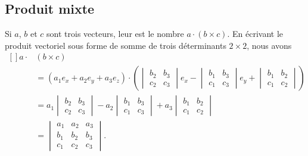 \subsection{Produit mixte}

Si $a$, $b$ et $c$ sont trois vecteurs, leur  est le nombre $a\cdot(b\times c)$. En écrivant le produit vectoriel sous forme de somme de trois déterminants $2\times 2$, nous avons
\begin{equation}
    \begin{aligned}[]
        a\cdot& (b\times c)\\&=(a_1e_x+a_2e_y+a_3e_z)\cdot\left(
        \begin{vmatrix}
            b_2    &   b_3    \\
            c_2    &   c_3
        \end{vmatrix}e_x-\begin{vmatrix}
            b_1    &   b_3    \\
            c_1    &   c_3
        \end{vmatrix}e_y+\begin{vmatrix}
            b_1    &   b_2    \\
            c_1    &   c_2
        \end{vmatrix}\right)\\
        &=a_1\begin{vmatrix}
            b_2    &   b_3    \\
            c_2    &   c_3
        \end{vmatrix}-a_2\begin{vmatrix}
            b_1    &   b_3    \\
            c_1    &   c_3
        \end{vmatrix}+a_3\begin{vmatrix}
            b_1    &   b_2    \\
            c_1    &   c_2
        \end{vmatrix}\\
        &=\begin{vmatrix}
            a_1    &   a_2    &   a_3    \\
            b_1    &   b_2    &   b_3    \\
            c_1    &   c_2    &   c_3
        \end{vmatrix}.
    \end{aligned}
\end{equation}
